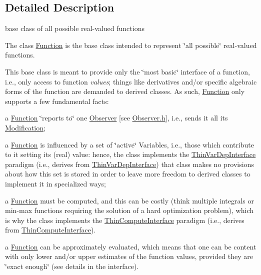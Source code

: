 \subsection{Detailed Description}
base class of all possible real-\/valued functions 

The class \mbox{\hyperlink{class_s_m_spp__di__unipi__it_1_1_function}{Function}} is the base class intended to represent \char`\"{}all possible\char`\"{} real-\/valued functions.

This base class is meant to provide only the \char`\"{}most basic\char`\"{} interface of a function, i.\+e., only access to function {\itshape values}; things like derivatives and/or specific algebraic forms of the function are demanded to derived classes. As such, \mbox{\hyperlink{class_s_m_spp__di__unipi__it_1_1_function}{Function}} only supports a few fundamental facts\+:


\begin{DoxyItemize}
\item a \mbox{\hyperlink{class_s_m_spp__di__unipi__it_1_1_function}{Function}} \char`\"{}reports to\char`\"{} one \mbox{\hyperlink{class_s_m_spp__di__unipi__it_1_1_observer}{Observer}} \mbox{[}see \mbox{\hyperlink{_observer_8h}{Observer.\+h}}\mbox{]}, i.\+e., sends it all its \mbox{\hyperlink{class_s_m_spp__di__unipi__it_1_1_modification}{Modification}};
\item a \mbox{\hyperlink{class_s_m_spp__di__unipi__it_1_1_function}{Function}} is influenced by a set of \char`\"{}active\char`\"{} Variables, i.\+e., those which contribute to it setting its (real) value\+: hence, the class implements the \mbox{\hyperlink{class_s_m_spp__di__unipi__it_1_1_thin_var_dep_interface}{Thin\+Var\+Dep\+Interface}} paradigm (i.\+e., derives from \mbox{\hyperlink{class_s_m_spp__di__unipi__it_1_1_thin_var_dep_interface}{Thin\+Var\+Dep\+Interface}}) that class makes no provisions about how this set is stored in order to leave more freedom to derived classes to implement it in specialized ways;
\item a \mbox{\hyperlink{class_s_m_spp__di__unipi__it_1_1_function}{Function}} must be computed, and this can be costly (think multiple integrals or min-\/max functions requiring the solution of a hard optimization problem), which is why the class implements the \mbox{\hyperlink{class_s_m_spp__di__unipi__it_1_1_thin_compute_interface}{Thin\+Compute\+Interface}} paradigm (i.\+e., derives from \mbox{\hyperlink{class_s_m_spp__di__unipi__it_1_1_thin_compute_interface}{Thin\+Compute\+Interface}}).
\item a \mbox{\hyperlink{class_s_m_spp__di__unipi__it_1_1_function}{Function}} can be approximately evaluated, which means that one can be content with only lower and/or upper estimates of the function values, provided they are \char`\"{}exact enough\char`\"{} (see details in the interface).
\end{DoxyItemize}


